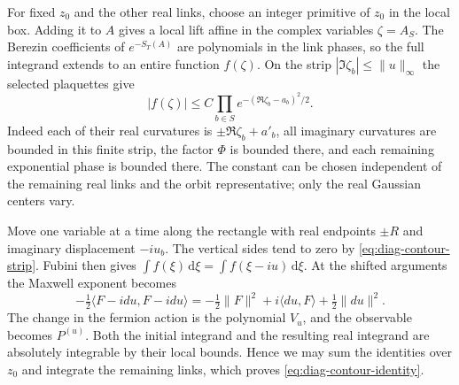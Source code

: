 \documentclass[11pt,letterpaper,reqno]{amsart}
\newcommand{\dd}{\mathrm d}
\begin{document}
For fixed $z_0$ and the other real links, choose an integer
primitive of $z_0$ in the local box. Adding it to $A$ gives
a local lift affine in the complex variables $\zeta=A_S$.
The Berezin coefficients of $e^{-S_T(A)}$ are polynomials
in the link phases, so the full integrand extends to an
entire function $f(\zeta)$. On the strip
$|\Im\zeta_b|\le\|u\|_\infty$ the selected plaquettes give
\begin{equation}\label{eq:diag-contour-strip}
 |f(\zeta)|\le C
          \prod_{b\in S}e^{-(\Re\zeta_b-a_b)^2/2}.
\end{equation}
Indeed each of their real curvatures is $\pm\Re\zeta_b+a'_b$,
all imaginary curvatures are bounded in this finite strip,
the factor $\Phi$ is bounded there, and each remaining
exponential phase is bounded there. The constant can be
chosen independent of the remaining real links and the
orbit representative; only the real Gaussian centers vary.

Move one variable at a time along the rectangle with real
endpoints $\pm R$ and imaginary displacement $-iu_b$. The
vertical sides tend to zero by \eqref{eq:diag-contour-strip}.
Fubini then gives $\int f(\xi)\,\dd\xi=
\int f(\xi-iu)\,\dd\xi$. At the shifted arguments the
Maxwell exponent becomes
\[
 -\tfrac12\langle F-idu,F-idu\rangle
       =-\tfrac12\|F\|^2+i\langle du,F\rangle+\tfrac12\|du\|^2.
\]
The change in the fermion action is the polynomial $V_u$,
and the observable becomes $P^{(u)}$. Both the initial
integrand and the resulting real integrand are absolutely
integrable by their local bounds. Hence we may sum the
identities over $z_0$ and integrate the remaining links,
which proves \eqref{eq:diag-contour-identity}.
\end{document}
